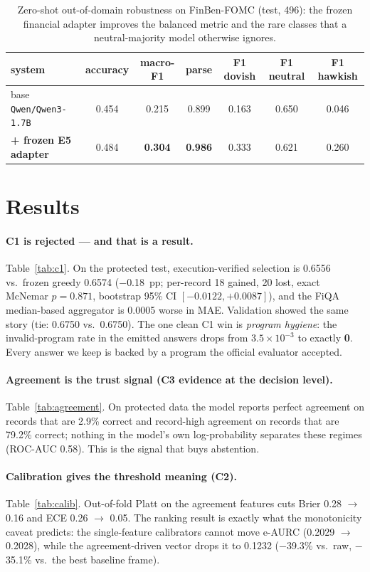 \documentclass[10pt]{article}
\begin{document}
\begin{table}[t]
\centering
\caption{\label{tab:fomc} Zero-shot out-of-domain robustness on FinBen-FOMC (test, 496):
the frozen financial adapter improves the balanced metric and the rare classes that a
neutral-majority model otherwise ignores.}
\small
\begin{tabular}{lcccccc}
\toprule
system & accuracy & macro-F1 & parse & F1 dovish & F1 neutral & F1 hawkish\\
\midrule
base \texttt{Qwen/Qwen3-1.7B} & 0.454 & 0.215 & 0.899 & 0.163 & 0.650 & 0.046\\
\textbf{+ frozen E5 adapter} & 0.484 & \textbf{0.304} & \textbf{0.986} & 0.333 & 0.621 & 0.260\\
\bottomrule
\end{tabular}
\end{table}

\section{Results}\label{sec:results}
\paragraph{C1 is rejected --- and that is a result.}
Table~\ref{tab:c1}. On the protected test, execution-verified selection is 0.6556 vs.\
frozen greedy 0.6574 ($-$0.18~pp; per-record 18 gained, 20 lost, exact McNemar $p=0.871$,
bootstrap 95\% CI $[-0.0122,+0.0087]$), and the FiQA median-based
aggregator is 0.0005 worse in MAE. Validation showed the same story (tie: 0.6750 vs.\ 0.6750).
The one clean C1 win is \emph{program hygiene}: the invalid-program rate in the emitted
answers drops from $3.5\times10^{-3}$ to exactly \textbf{0}. Every answer we keep is backed
by a program the official evaluator accepted.

\paragraph{Agreement is the trust signal (C3 evidence at the decision level).}
Table~\ref{tab:agreement}. On protected data the
model reports perfect agreement on records that are 2.9\% correct and record-high agreement
on records that are 79.2\% correct; nothing in the model's own log-probability separates
these regimes (ROC-AUC 0.58). This is the signal that buys abstention.

\paragraph{Calibration gives the threshold meaning (C2).}
Table~\ref{tab:calib}. Out-of-fold Platt on the agreement features cuts Brier 0.28
$\rightarrow$ 0.16 and ECE 0.26 $\rightarrow$ 0.05. The ranking result is exactly what the
monotonicity caveat predicts: the single-feature calibrators cannot move e-AURC
(0.2029 $\rightarrow$ 0.2028), while the agreement-driven vector drops it to 0.1232
($-$39.3\% vs.\ raw, $-$35.1\% vs.\ the best baseline frame).
\end{document}
